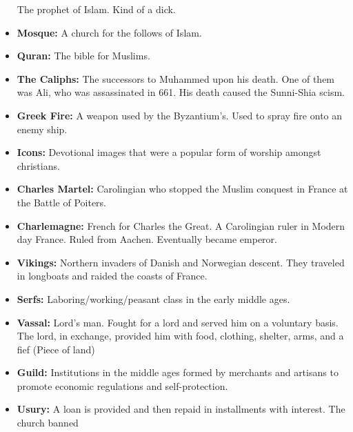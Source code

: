 \documentclass[crop=false,class=book]{standalone}
\begin{document}
\begin{itemize}[noitemsep]
                    The prophet of Islam. Kind of a dick.
                \item \textbf{Mosque:}
                A church for the follows of Islam.
                \item \textbf{Quran:}
                    The bible for Muslims.
                \item \textbf{The Caliphs:}
                    The successors to Muhammed upon his death. One
                    of them was Ali, who was assassinated in 661.
                    His death caused the Sunni-Shia scism.
                \item \textbf{Greek Fire:}
                    A weapon used by the Byzantium’s. Used to spray
                    fire onto an enemy ship.
                \item \textbf{Icons:}
                    Devotional images that were a popular form of
                    worship amongst christians.
                \item \textbf{Charles Martel:}
                    Carolingian who stopped the Muslim conquest in
                    France at the Battle of Poiters.
                \item \textbf{Charlemagne:}
                    French for Charles the Great. A Carolingian
                    ruler in Modern day France. Ruled from Aachen.
                    Eventually became emperor. 
                \item \textbf{Vikings:}
                    Northern invaders of Danish and Norwegian
                    descent. They traveled in longboats and raided
                    the coasts of France.
                \item \textbf{Serfs:}
                    Laboring/working/peasant class in the early
                    middle ages.
                \item \textbf{Vassal:}
                    Lord’s man. Fought for a lord and served him on
                    a voluntary basis. The lord, in exchange,
                    provided him with food, clothing, shelter, arms,
                    and a fief (Piece of land)
                \item \textbf{Guild:}
                    Institutions in the middle ages formed by
                    merchants and artisans to promote economic
                    regulations and self-protection.
                \item \textbf{Usury:}
                    A loan is provided and then repaid in
                    installments with interest. The church banned

\end{itemize}
\end{document}
